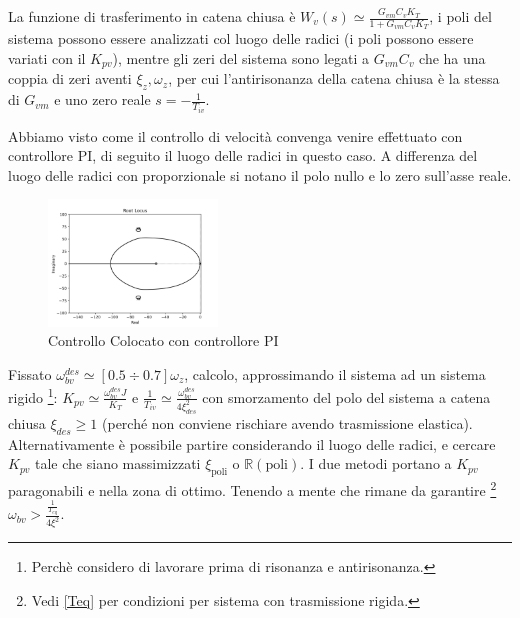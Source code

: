 La funzione di trasferimento in catena chiusa è \(W_v(s) \simeq \frac{G_{vm}C_v K_T}{1+G_{vm}C_v K_T}\), i poli del sistema possono essere analizzati col luogo delle radici (i poli possono essere variati con il \(K_{pv}\)), mentre gli zeri del sistema sono legati a \(G_{vm}C_v\) che ha una coppia di zeri aventi \(\xi_z, \omega_z\), per cui l'antirisonanza della catena chiusa è la stessa di \(G_{vm}\) e uno zero reale \(s=-\frac{1}{T_{iv}}\).

Abbiamo visto come il controllo di velocità convenga venire effettuato con controllore PI, di seguito il luogo delle radici in questo caso. A differenza del luogo delle radici con proporzionale si notano il polo nullo e lo zero sull'asse reale.

\begin{figure}[h]
    \centering
    \includegraphics[width=0.4\textwidth]{Immagini/controllo_v_colocato_PI.png}
    \caption{Controllo Colocato con controllore PI}
\end{figure}

Fissato \(\omega_{bv}^{des} \simeq [0.5\div 0.7]\omega_z\), calcolo, approssimando il sistema ad un sistema rigido \footnote{Perchè considero di lavorare prima di risonanza e antirisonanza.}: \(K_{pv} \simeq \frac{\omega_{bv}^{des} J}{K_T}\) e \(\frac{1}{T_{iv}} \simeq \frac{\omega_{bv}^{des}}{4 \xi_{des}^2}\) con smorzamento del polo del sistema a catena chiusa \(\xi_{des} \geqslant 1\) (perché non conviene rischiare avendo trasmissione elastica).
Alternativamente è possibile partire considerando il luogo delle radici, e cercare \(K_{pv}\) tale che siano massimizzati \(\xi_\text{poli}\) o \(\mathbb{R}(\text{poli})\).
I due metodi portano a \(K_{pv}\) paragonabili e nella zona di ottimo.
Tenendo a mente che rimane da garantire \footnote{Vedi \ref{Teq} per condizioni per sistema con trasmissione rigida.} \(\omega_{bv} > \frac{\frac{1}{T_{eq}}}{4\xi^2}\).

